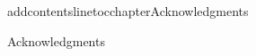addcontentsline{toc}{chapter}{Acknowledgments}
\thispagestyle{empty}

\vspace*{2cm}
\begin{center}
Acknowledgments
\end{center}

\vspace{1cm}


\cleardoublepage{}
